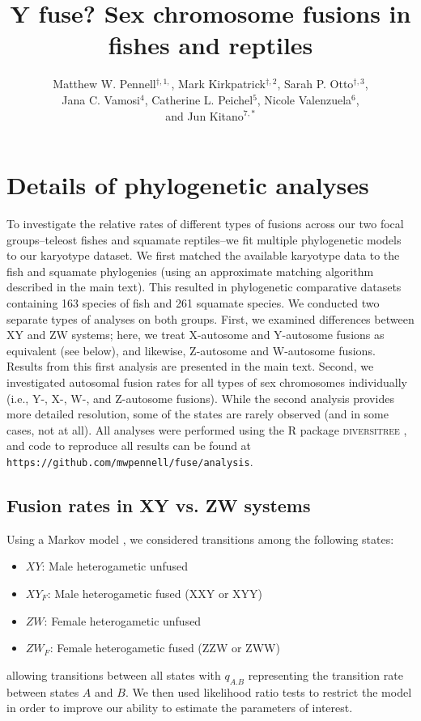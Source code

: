 \documentclass[12pt,twoside]{article}
\title{Y fuse? Sex chromosome fusions in fishes and reptiles}
\author{Matthew W. Pennell$^{\dag, 1,}$, Mark Kirkpatrick$^{\dag, 2}$, Sarah P. Otto$^{\dag, 3}$,\\ Jana C. Vamosi$^{4}$, Catherine L. Peichel$^5$, Nicole Valenzuela$^{6}$,\\ and Jun Kitano$^{7,*}$}
\date{}
\begin{document}
\maketitle

\section{Details of phylogenetic analyses}

To investigate the relative rates of different types of fusions across our two focal groups--teleost fishes and squamate reptiles--we fit multiple phylogenetic models to our karyotype dataset. We first matched the available karyotype data to the fish \citep{Rabosky2013} and squamate \citep{squamatetree, PyronBurbrink2014} phylogenies (using an approximate matching algorithm described in the main text). This resulted in phylogenetic comparative datasets containing 163 species of fish and 261 squamate species.  We conducted two separate types of analyses on both groups. First, we examined differences between XY and ZW systems; here, we treat X-autosome and Y-autosome fusions as equivalent (see below), and likewise, Z-autosome and W-autosome fusions. Results from this first analysis are presented in the main text. Second, we investigated autosomal fusion rates for all types of sex chromosomes individually (i.e., Y-, X-, W-, and Z-autosome fusions). While the second analysis provides more detailed resolution, some of the states are rarely observed (and in some cases, not at all). All analyses were performed using the R package \textsc{diversitree} \citep{FitzJohn2012}, and code to reproduce all results can be found at \texttt{https://github.com/mwpennell/fuse/analysis}. 

\subsection{Fusion rates in XY vs. ZW systems}

Using a Markov model \citep{Pagel1994}, we considered transitions among the following states:
\begin{itemize}
\item $XY$: Male heterogametic unfused
\item $XY_F$: Male heterogametic fused (XXY or XYY)
\item $ZW$: Female heterogametic unfused
\item $ZW_F$: Female heterogametic fused (ZZW or ZWW)
\end{itemize}
allowing transitions between all states with $q_{A.B}$ representing the transition rate between states $A$ and $B$. We then used likelihood ratio tests to restrict the model in order to improve our ability to estimate the parameters of interest. 
\end{document}
